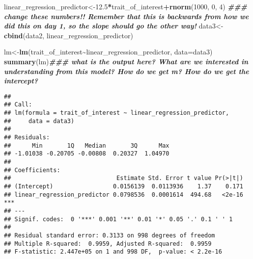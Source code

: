 \documentclass[
]{article}
\newenvironment{Shaded}{\begin{snugshade}}{\end{snugshade}}
\newcommand{\AttributeTok}[1]{\textcolor[rgb]{0.13,0.29,0.53}{#1}}
\newcommand{\DecValTok}[1]{\textcolor[rgb]{0.00,0.00,0.81}{#1}}
\newcommand{\DocumentationTok}[1]{\textcolor[rgb]{0.56,0.35,0.01}{\textbf{\textit{#1}}}}
\newcommand{\FloatTok}[1]{\textcolor[rgb]{0.00,0.00,0.81}{#1}}
\newcommand{\FunctionTok}[1]{\textcolor[rgb]{0.13,0.29,0.53}{\textbf{#1}}}
\newcommand{\NormalTok}[1]{#1}
\newcommand{\OtherTok}[1]{\textcolor[rgb]{0.56,0.35,0.01}{#1}}
\newcommand{\SpecialCharTok}[1]{\textcolor[rgb]{0.81,0.36,0.00}{\textbf{#1}}}
\newcommand{\StringTok}[1]{\textcolor[rgb]{0.31,0.60,0.02}{#1}}
\begin{document}
\begin{Shaded}
\begin{Highlighting}[]
\NormalTok{linear\_regression\_predictor}\OtherTok{\textless{}{-}}\FloatTok{12.5}\SpecialCharTok{*}\NormalTok{trait\_of\_interest}\SpecialCharTok{+}\FunctionTok{rnorm}\NormalTok{(}\DecValTok{1000}\NormalTok{, }\DecValTok{0}\NormalTok{, }\DecValTok{4}\NormalTok{) }\DocumentationTok{\#\#\# change these numbers!! Remember that this is backwards from how we did this on day 1, so the slope should go the other way!}
\NormalTok{data3}\OtherTok{\textless{}{-}}\FunctionTok{cbind}\NormalTok{(data2, linear\_regression\_predictor)}

\NormalTok{lm}\OtherTok{\textless{}{-}}\FunctionTok{lm}\NormalTok{(trait\_of\_interest}\SpecialCharTok{\textasciitilde{}}\NormalTok{linear\_regression\_predictor, }\AttributeTok{data=}\NormalTok{data3)}
\FunctionTok{summary}\NormalTok{(lm)}\DocumentationTok{\#\#\# what is the output here? What are we interested in understanding from this model? How do we get m? How do we get the intercept?}
\end{Highlighting}
\end{Shaded}

\begin{verbatim}
## 
## Call:
## lm(formula = trait_of_interest ~ linear_regression_predictor, 
##     data = data3)
## 
## Residuals:
##      Min       1Q   Median       3Q      Max 
## -1.01038 -0.20705 -0.00808  0.20327  1.04970 
## 
## Coefficients:
##                              Estimate Std. Error t value Pr(>|t|)    
## (Intercept)                 0.0156139  0.0113936    1.37    0.171    
## linear_regression_predictor 0.0798536  0.0001614  494.68   <2e-16 ***
## ---
## Signif. codes:  0 '***' 0.001 '**' 0.01 '*' 0.05 '.' 0.1 ' ' 1
## 
## Residual standard error: 0.3133 on 998 degrees of freedom
## Multiple R-squared:  0.9959, Adjusted R-squared:  0.9959 
## F-statistic: 2.447e+05 on 1 and 998 DF,  p-value: < 2.2e-16
\end{verbatim}

\begin{Shaded}
\end{Shaded}
\end{document}
